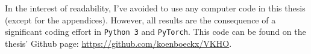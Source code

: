 In the interest of readability, I've avoided to use any computer code in this thesis (except for the appendices). However, all results are the consequence of a significant coding effort in {\tt Python 3} and {\tt PyTorch}. This code can be found on the thesis' Github page: \url{https://github.com/koenboeckx/VKHO}.

%
%
%
